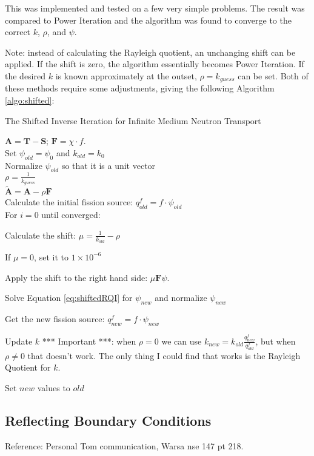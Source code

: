 \documentclass[12pt, letterpaper]{article}
\newcommand{\ve}[1]{\ensuremath{\mathbf{#1}}}
\begin{document}
This was implemented and tested on a few very simple problems. The result was compared to Power Iteration and the algorithm was found to converge to the correct $k$, $\rho$, and $\psi$. 

Note: instead of calculating the Rayleigh quotient, an unchanging shift can be applied. If the shift is zero, the algorithm essentially becomes Power Iteration. If the desired $k$ is known approximately at the outset, $\rho = k_{guess}$ can be set. Both of these methods require some adjustments, giving the following Algorithm \ref{algo:shifted}:
%
\begin{algorithm}
\caption{The Shifted Inverse Iteration for Infinite Medium Neutron Transport}
  $\ve{A} = \ve{T} - \ve{S}$; $\ve{F} = \chi \cdot f$.\\
  Set $\psi_{old} = \psi_{0}$ and $k_{old} = k_{0}$ \\
  Normalize $\psi_{old}$ so that it is a unit vector \\
  $\rho = \frac{1}{k_{guess}}$ \\
  $\ve{\tilde{A}} = \ve{A} - \rho \ve{F}$ \\
  Calculate the initial fission source: $q^{f}_{old} = f \cdot \psi_{old}$ \\
  For $i = 0$ until converged:
  \begin{list}{}{\hspace{2em}}
     \item Calculate the shift: $\mu = \frac{1}{k_{old}} - \rho$
     \item If $\mu = 0$, set it to $1 \times 10^{-6}$
     \item Apply the shift to the right hand side: $\mu \ve{F} \psi$.
     \item Solve Equation \eqref{eq:shiftedRQI} for $\psi_{new}$ and normalize $\psi_{new}$
     \item Get the new fission source: $q^{f}_{new} = f \cdot \psi_{new}$
     \item Update $k$ *** Important ***: when $\rho=0$ we can use $k_{new} = k_{old} \frac{q^{f}_{new}}{q^{f}_{old}}$,  but when $\rho \ne 0$ that doesn't work. The only thing I could find that works is the Rayleigh Quotient for $k$. 
     \item Set $new$ values to $old$
  \end{list}
  \label{algo:shifted}
\end{algorithm}

\subsection{Reflecting Boundary Conditions} Reference: Personal Tom communication, Warsa nse 147 pt 218.
\end{document}
